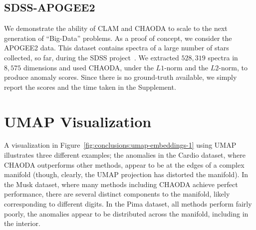 \subsection{SDSS-APOGEE2}
\label{subsec:results:sdss-apogee2}

We demonstrate the ability of CLAM and CHAODA to scale to the next generation of ``Big-Data'' problems.
As a proof of concept, we consider the APOGEE2 data.
This dataset contains spectra of a large number of stars collected, so far, during the SDSS project~\cite{blanton2017sdss}.
We extracted $528,319$ spectra in $8,575$ dimensions and used CHAODA, under the $L1$-norm and the $L2$-norm, to produce anomaly scores.
Since there is no ground-truth available, we simply report the scores and the time taken in the Supplement.


\section{UMAP Visualization}
\label{sec:umap-visualization}

A visualization in Figure~\ref{fig:conclusions:umap-embeddings-1} using UMAP illustrates three different examples;
the anomalies in the Cardio dataset, where CHAODA outperforms other methods, appear to be at the edges of a complex manifold (though, clearly, the UMAP projection has distorted the manifold). In the Musk dataset, where many methods including CHAODA achieve perfect performance, there are several distinct components to the manifold, likely corresponding to different digits.
In the Pima dataset, all methods perform fairly poorly, the anomalies appear to be distributed across the manifold, including in the interior.

